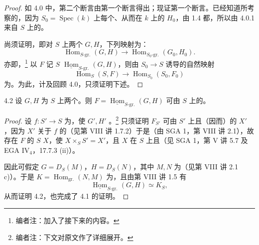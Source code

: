 \begin{proof}
如 4.0 中，第二个断言由第一个断言得出；现证第一个断言。已经知道所考察的，因为 $S_0=\operatorname{Spec}(k)$ 上每个、从而在 $k$ 上的 $H_0$，由 1.4 都，所以由 4.0.1 来自 $S$ 上的。

尚须证明，即对 $S$ 上两个 $G,H$，下列映射为：
\[
\operatorname{Hom}_{S\text{-gr.}}(G,H)\longrightarrow
\operatorname{Hom}_{S_0\text{-gr.}}(G_0,H_0).
\]
亦即，\footnote[22]{编者注：加入了接下来的内容。} 以 $F$ 记 $S$  $\underline{\operatorname{Hom}}_{S\text{-gr.}}(G,H)$，则由 $S_0\to S$ 诱导的自然映射
\[
\operatorname{Hom}_S(S,F)\longrightarrow\operatorname{Hom}_{S_0}(S_0,F_0)
\]
为。为此，计及回顾 4.0，只须证明下述。
\end{proof}
\begin{SGAresult}{}{4.2}
设 $G,H$ 为 $S$ 上两个。则 $F=\underline{\operatorname{Hom}}_{S\text{-gr.}}(G,H)$ 可由 $S$ 上的。
\end{SGAresult}
\begin{proof}
设 $f:S'\to S$ 为，使 $G',H'$ 。\footnote[23]{编者注：下文对原文作了详细展开。} 只须证明 $F_{S'}$ 可由 $S'$ 上且（因而）的 $X'$ ，因为 $X'$ 关于 $f$ 的（见第 VIII 讲 1.7.2）于是（由 SGA 1，第 VIII 讲 2.1），故存在 $F$ 的 $S$  $X$，使 $X\times_S S'=X'$，且 $X$ 在 $S$ 上且（见 SGA 1，第 V 讲 5.7 及 EGA IV$_4$，17.7.3 (ii)）。

因此可假定 $G=D_S(M)$，$H=D_S(N)$，其中 $M,N$ 为（见第 VIII 讲 2.1 c)）。于是 $K=\operatorname{Hom}_{\mathrm{gr.}}(N,M)$ 为，且由第 VIII 讲 1.5 有
\[
\underline{\operatorname{Hom}}_{S\text{-gr.}}(G,H)\simeq K_S,
\]
从而证明 4.2，也完成了 4.1 的证明。
\end{proof}
